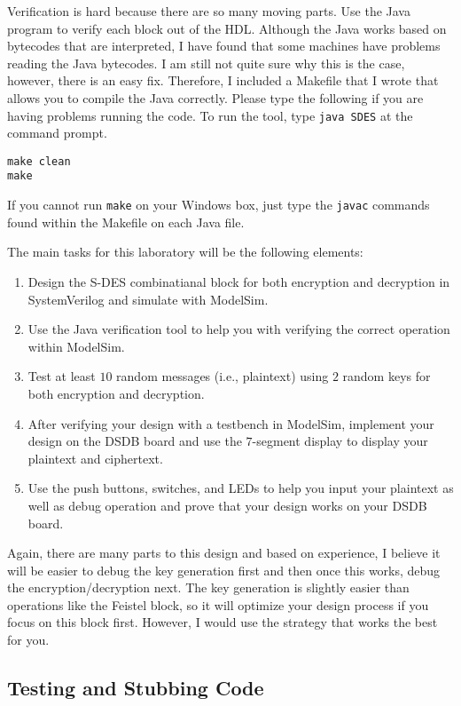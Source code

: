 \documentclass{article}
\begin{document}
Verification is hard because there are so many moving parts.  Use the
Java program to verify each block out of the HDL.  Although the Java
works based on bytecodes that are interpreted, I have found that some
machines have problems reading the Java bytecodes.  I am still not
quite sure why this is the case, however, there is an easy fix.
Therefore, I included a
Makefile that I wrote that allows you to compile the Java correctly.
Please type the following if you are having problems running the
code.  To run the tool, type \verb!java SDES! at the command prompt.
\begin{verbatim}
make clean
make
\end{verbatim}
If you cannot run \verb!make! on your Windows box, just type the
\verb!javac! commands found within the Makefile on each Java file.  

The main tasks for this laboratory
will be the following elements:
\begin{enumerate}
  \item Design the S-DES combinatianal block for both encryption and
    decryption in SystemVerilog and simulate with ModelSim.
  \item Use the Java verification tool to help you with verifying the
    correct operation within ModelSim.
  \item Test at least $10$ random messages (i.e., plaintext) using
    $2$ random keys for both encryption and decryption.
  \item After verifying your design with a testbench in ModelSim,
    implement your design on the DSDB board and use the    
    $7$-segment display to display your plaintext and ciphertext.
  \item Use the push buttons, switches, and LEDs to help you input
    your plaintext as well as debug operation and prove that your
    design works on your DSDB board.
\end{enumerate}
Again, there are many parts to this design and based on experience, I
believe it will be easier to debug the key generation first and then
once this works, debug the encryption/decryption next.  The key
generation is slightly easier than operations like the Feistel block,
so it will optimize your design process if you focus on this block
first.  However, I would use the strategy that works the best for you.

\subsection{Testing and Stubbing Code}
\end{document}

